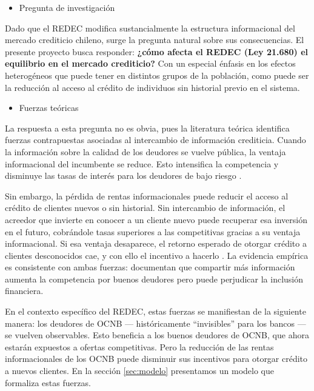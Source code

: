 \documentclass[11pt]{article}
\theoremstyle{plain}
\theoremstyle{plain}
\begin{document}
\begin{itemize}
    \item Pregunta de investigación
\end{itemize}
Dado que el REDEC modifica sustancialmente la estructura informacional del mercado crediticio chileno, surge la pregunta natural sobre sus consecuencias. El presente proyecto busca responder: \textbf{¿cómo afecta el REDEC (Ley 21.680) el equilibrio en el mercado crediticio?} Con un especial énfasis en los efectos heterogéneos que puede tener en distintos grupos de la población, como puede ser la reducción al acceso al crédito de individuos sin historial previo en el sistema.

\begin{itemize}
    \item Fuerzas teóricas
\end{itemize}
La respuesta a esta pregunta no es obvia, pues la literatura teórica identifica fuerzas contrapuestas asociadas al intercambio de información crediticia. Cuando la información sobre la calidad de los deudores se vuelve pública, la ventaja informacional del incumbente se reduce. Esto intensifica la competencia y disminuye las tasas de interés para los deudores de bajo riesgo \parencite{sharpe_asymmetric_1990, petersen_effect_1995}.

Sin embargo, la pérdida de rentas informacionales puede reducir el acceso al crédito de clientes nuevos o sin historial. Sin intercambio de información, el acreedor que invierte en conocer a un cliente nuevo puede recuperar esa inversión en el futuro, cobrándole tasas superiores a las competitivas gracias a su ventaja informacional. Si esa ventaja desaparece, el retorno esperado de otorgar crédito a clientes desconocidos cae, y con ello el incentivo a hacerlo \parencite{petersen_effect_1995, dellariccia_information_2004}. La evidencia empírica es consistente con ambas fuerzas: \textcite{foley_effects_2020} documentan que compartir más información aumenta la competencia por buenos deudores pero puede perjudicar la inclusión financiera.

En el contexto específico del REDEC, estas fuerzas se manifiestan de la siguiente manera: los deudores de OCNB --- históricamente ``invisibles'' para los bancos --- se vuelven observables. Esto beneficia a los buenos deudores de OCNB, que ahora estarán expuestos a ofertas competitivas. Pero la reducción de las rentas informacionales de los OCNB puede disminuir sus incentivos para otorgar crédito a nuevos clientes. En la sección \ref{sec:modelo} presentamos un modelo que formaliza estas fuerzas.
\end{document}

